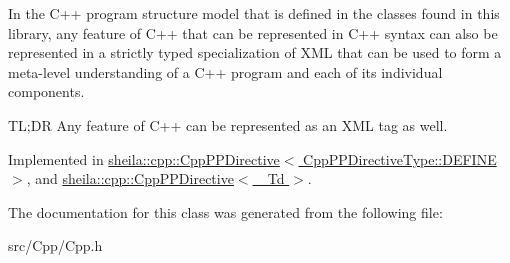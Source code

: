 In the C++ program structure model that is defined in the classes found in this library, any feature of C++ that can be represented in C++ syntax can also be represented in a strictly typed specialization of X\+ML that can be used to form a meta-\/level understanding of a C++ program and each of it\textquotesingle{}s individual components.

TL;DR Any feature of C++ can be represented as an X\+ML tag as well. 

Implemented in \hyperlink{classsheila_1_1cpp_1_1CppPPDirective_3_01CppPPDirectiveType_1_1DEFINE_01_4_ab46d249d848db43b0b0e4d28ea407bf3}{sheila\+::cpp\+::\+Cpp\+P\+P\+Directive$<$ Cpp\+P\+P\+Directive\+Type\+::\+D\+E\+F\+I\+N\+E $>$}, and \hyperlink{classsheila_1_1cpp_1_1CppPPDirective_ab3c20665d4ad7c66b9085175c084623e}{sheila\+::cpp\+::\+Cpp\+P\+P\+Directive$<$ \+\_\+\+Td $>$}.



The documentation for this class was generated from the following file\+:\begin{DoxyCompactItemize}
\item 
src/\+Cpp/Cpp.\+h\end{DoxyCompactItemize}
